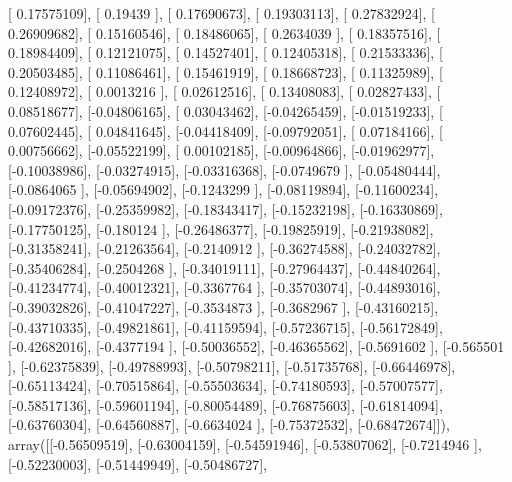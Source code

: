 \documentclass{article}
\begin{document}
       [ 0.17575109],
       [ 0.19439   ],
       [ 0.17690673],
       [ 0.19303113],
       [ 0.27832924],
       [ 0.26909682],
       [ 0.15160546],
       [ 0.18486065],
       [ 0.2634039 ],
       [ 0.18357516],
       [ 0.18984409],
       [ 0.12121075],
       [ 0.14527401],
       [ 0.12405318],
       [ 0.21533336],
       [ 0.20503485],
       [ 0.11086461],
       [ 0.15461919],
       [ 0.18668723],
       [ 0.11325989],
       [ 0.12408972],
       [ 0.0013216 ],
       [ 0.02612516],
       [ 0.13408083],
       [ 0.02827433],
       [ 0.08518677],
       [-0.04806165],
       [ 0.03043462],
       [-0.04265459],
       [-0.01519233],
       [ 0.07602445],
       [ 0.04841645],
       [-0.04418409],
       [-0.09792051],
       [ 0.07184166],
       [ 0.00756662],
       [-0.05522199],
       [ 0.00102185],
       [-0.00964866],
       [-0.01962977],
       [-0.10038986],
       [-0.03274915],
       [-0.03316368],
       [-0.0749679 ],
       [-0.05480444],
       [-0.0864065 ],
       [-0.05694902],
       [-0.1243299 ],
       [-0.08119894],
       [-0.11600234],
       [-0.09172376],
       [-0.25359982],
       [-0.18343417],
       [-0.15232198],
       [-0.16330869],
       [-0.17750125],
       [-0.180124  ],
       [-0.26486377],
       [-0.19825919],
       [-0.21938082],
       [-0.31358241],
       [-0.21263564],
       [-0.2140912 ],
       [-0.36274588],
       [-0.24032782],
       [-0.35406284],
       [-0.2504268 ],
       [-0.34019111],
       [-0.27964437],
       [-0.44840264],
       [-0.41234774],
       [-0.40012321],
       [-0.3367764 ],
       [-0.35703074],
       [-0.44893016],
       [-0.39032826],
       [-0.41047227],
       [-0.3534873 ],
       [-0.3682967 ],
       [-0.43160215],
       [-0.43710335],
       [-0.49821861],
       [-0.41159594],
       [-0.57236715],
       [-0.56172849],
       [-0.42682016],
       [-0.4377194 ],
       [-0.50036552],
       [-0.46365562],
       [-0.5691602 ],
       [-0.565501  ],
       [-0.62375839],
       [-0.49788993],
       [-0.50798211],
       [-0.51735768],
       [-0.66446978],
       [-0.65113424],
       [-0.70515864],
       [-0.55503634],
       [-0.74180593],
       [-0.57007577],
       [-0.58517136],
       [-0.59601194],
       [-0.80054489],
       [-0.76875603],
       [-0.61814094],
       [-0.63760304],
       [-0.64560887],
       [-0.6634024 ],
       [-0.75372532],
       [-0.68472674]]), array([[-0.56509519],
       [-0.63004159],
       [-0.54591946],
       [-0.53807062],
       [-0.7214946 ],
       [-0.52230003],
       [-0.51449949],
       [-0.50486727],
\end{document}
